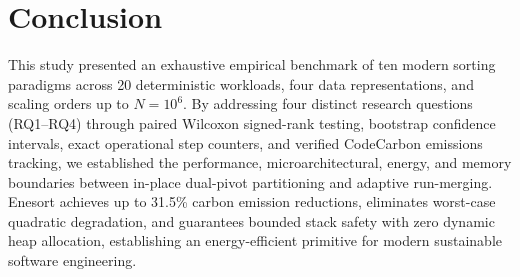 \documentclass[journal]{IEEEtran}
\begin{document}
\section{Conclusion}
This study presented an exhaustive empirical benchmark of ten modern sorting paradigms across 20 deterministic workloads, four data representations, and scaling orders up to $N=10^6$. By addressing four distinct research questions (RQ1--RQ4) through paired Wilcoxon signed-rank testing, bootstrap confidence intervals, exact operational step counters, and verified CodeCarbon emissions tracking, we established the performance, microarchitectural, energy, and memory boundaries between in-place dual-pivot partitioning and adaptive run-merging. Enesort achieves up to 31.5\% carbon emission reductions, eliminates worst-case quadratic degradation, and guarantees bounded stack safety with zero dynamic heap allocation, establishing an energy-efficient primitive for modern sustainable software engineering.



\end{document}
